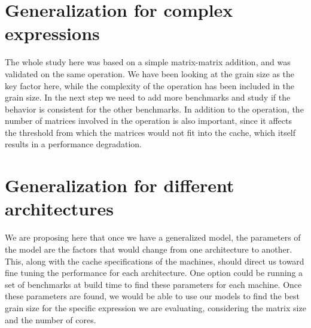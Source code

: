 \vspace{\baselineskip}	
\section{Generalization for complex expressions}
The whole study here was based on a simple matrix-matrix addition, and was validated on the same operation. We have been looking at the grain size as the key factor here, while the complexity of the operation has been included in the grain size. In the next step we need to add more benchmarks and study if the behavior is consistent for the other benchmarks. 
In addition to the operation, the number of matrices involved in the operation is also important, since it affects the threshold from which the matrices would not fit into the cache, which itself results in a performance degradation.


\vspace{\baselineskip}	
\section{Generalization for different architectures}
We are proposing here that once we have a generalized model, the parameters of the model are the factors that would change from one architecture to another. This, along with the cache specifications of the machines, should direct us toward fine tuning the performance for each architecture.
One option could be running a set of benchmarks at build time to find these parameters for each machine. Once these parameters are found, we would be able to use our models to find the best grain size for the specific expression we are evaluating, considering the matrix size and the number of cores.



